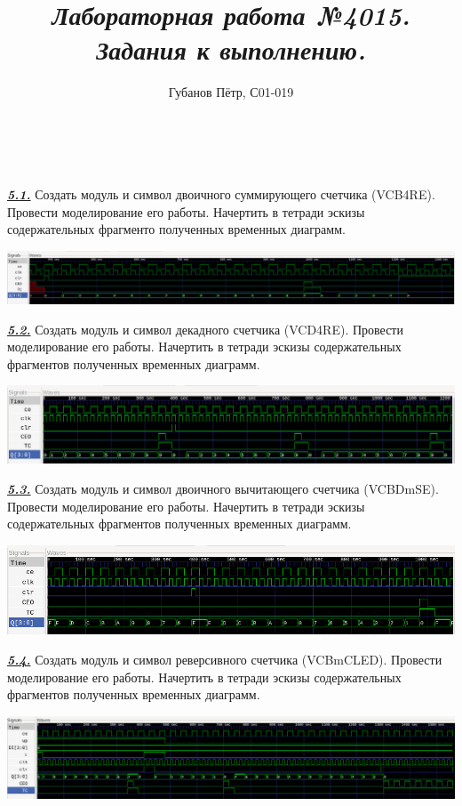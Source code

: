 \documentclass[a4paper]{article}
\begin{document}
\title{\textit{\textbf{Лабораторная работа №401}}}
\author{Губанов Пётр, С01-019}
\maketitle

\clearpage

\title{\large{\textit{5. Задания к выполнению.}}}\\\\

\textbf{\textit{\underline{5.1.}}} Создать модуль и символ двоичного суммирующего счетчика (VCB4RE). Провести моделирование его работы. Начертить в тетради эскизы содержательных фрагменто полученных временных диаграмм.
\begin{center}
	\includegraphics[scale=0.3]{../images/VCB4RE.png}
\end{center}

\textbf{\textit{\underline{5.2.}}} Создать модуль и символ декадного счетчика (VCD4RE). Провести моделирование его работы. Начертить в тетради эскизы содержательных фрагментов полученных временных диаграмм.
\begin{center}
	\includegraphics[scale=0.45]{../images/VCD4RE.png}
\end{center}

\textbf{\textit{\underline{5.3.}}} Создать модуль и символ двоичного вычитающего счетчика (VCBDmSE). Провести моделирование его работы. Начертить в тетради эскизы содержательных фрагментов полученных временных диаграмм.
\begin{center}
	\includegraphics[scale=0.5]{../images/VCBDmSE.png}
\end{center}

\textbf{\textit{\underline{5.4.}}} Создать модуль и символ реверсивного счетчика (VCBmCLED). Провести моделирование его работы. Начертить в тетради эскизы содержательных фрагментов полученных временных диаграмм.
\begin{center}
	\includegraphics[scale=0.39]{../images/VCBmCLED.png}
\end{center}
\end{document}
